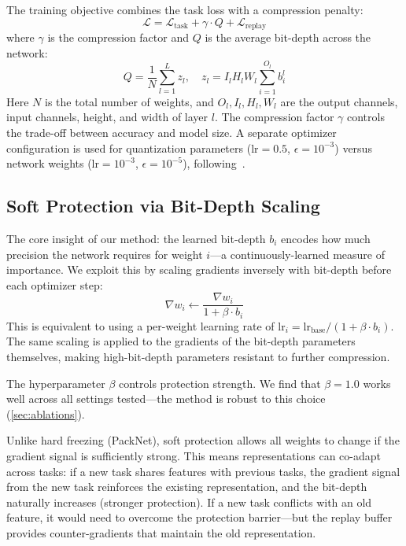 \documentclass[11pt]{article}
\begin{document}
The training objective combines the task loss with a compression penalty:
\begin{equation}
    \mathcal{L} = \mathcal{L}_{\text{task}} + \gamma \cdot Q + \mathcal{L}_{\text{replay}}
    \label{eq:total_loss}
\end{equation}
where $\gamma$ is the compression factor and $Q$ is the average bit-depth across the network:
\begin{equation}
    Q = \frac{1}{N} \sum_{l=1}^{L} z_l, \quad z_l = I_l H_l W_l \sum_{i=1}^{O_l} b_i^l
    \label{eq:avg_bitdepth}
\end{equation}
Here $N$ is the total number of weights, and $O_l, I_l, H_l, W_l$ are the output channels, input channels, height, and width of layer $l$.
The compression factor $\gamma$ controls the trade-off between accuracy and model size.
A separate optimizer configuration is used for quantization parameters (lr$=0.5$, $\epsilon=10^{-3}$) versus network weights (lr$=10^{-3}$, $\epsilon=10^{-5}$), following~\citep{csefalvay2023self}.

\subsection{Soft Protection via Bit-Depth Scaling}

The core insight of our method: the learned bit-depth $b_i$ encodes how much precision the network requires for weight $i$---a continuously-learned measure of importance.
We exploit this by scaling gradients inversely with bit-depth before each optimizer step:
\begin{equation}
    \nabla w_i \leftarrow \frac{\nabla w_i}{1 + \beta \cdot b_i}
    \label{eq:grad_scaling}
\end{equation}
This is equivalent to using a per-weight learning rate of $\text{lr}_i = \text{lr}_{\text{base}} / (1 + \beta \cdot b_i)$.
The same scaling is applied to the gradients of the bit-depth parameters themselves, making high-bit-depth parameters resistant to further compression.

The hyperparameter $\beta$ controls protection strength.
We find that $\beta = 1.0$ works well across all settings tested---the method is robust to this choice (\cref{sec:ablations}).

Unlike hard freezing (PackNet), soft protection allows all weights to change if the gradient signal is sufficiently strong.
This means representations can co-adapt across tasks: if a new task shares features with previous tasks, the gradient signal from the new task reinforces the existing representation, and the bit-depth naturally increases (stronger protection).
If a new task conflicts with an old feature, it would need to overcome the protection barrier---but the replay buffer provides counter-gradients that maintain the old representation.
\end{document}
